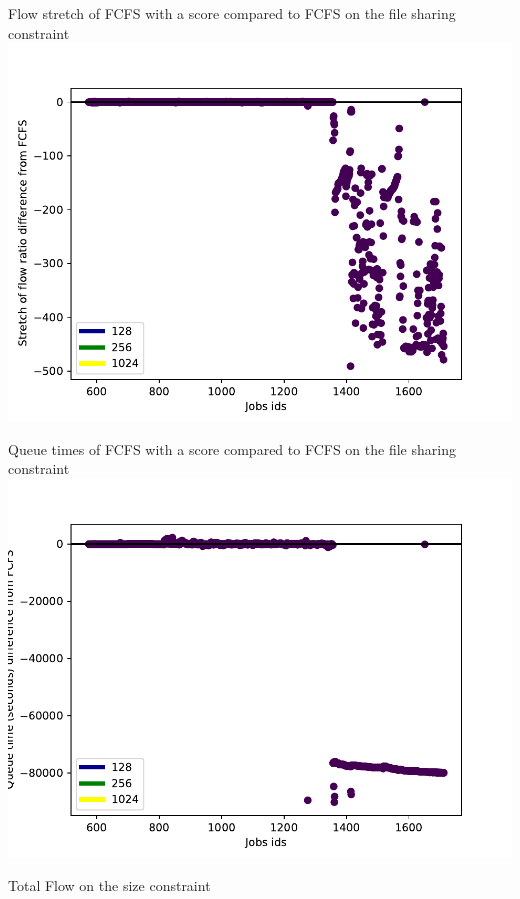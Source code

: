 \documentclass{libs/ufc_format}
\begin{document}
{\begin{frame}{Flow stretch of FCFS with a score compared to FCFS on the file sharing constraint}
	\center\includegraphics[scale=0.6]{../MBSS/plot/2022-02-08->2022-02-08_very_reduced_95_128_4_256_1_1024_FCFS_Score_x10_x7000_x0VSFCFS_stretch.pdf}
\end{frame}
\begin{frame}{Queue times of FCFS with a score compared to FCFS on the file sharing constraint}
	\center\includegraphics[scale=0.6]{../MBSS/plot/2022-02-08->2022-02-08_very_reduced_95_128_4_256_1_1024_FCFS_Score_x10_x7000_x0VSFCFS.pdf}
\end{frame}
\begin{frame}{Total Flow on the size constraint}

\end{frame}}
\end{document}

